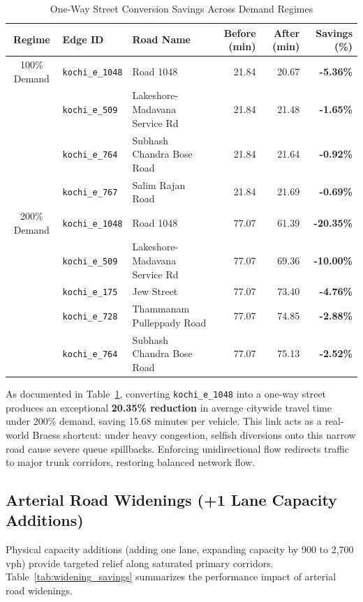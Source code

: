 \documentclass[12pt,a4paper]{report}
\begin{document}
\begin{table}[H]
\centering
\caption{One-Way Street Conversion Savings Across Demand Regimes}
\label{tab:oneway_savings}
\vspace{0.15cm}
\small
\begin{tabularx}{\textwidth}{clXrrr}
\toprule
\textbf{Regime} & \textbf{Edge ID} & \textbf{Road Name} & \textbf{Before (min)} & \textbf{After (min)} & \textbf{Savings (\%)} \\
\midrule
100\% Demand & \texttt{kochi\_e\_1048} & Road 1048 & 21.84 & 20.67 & \textbf{-5.36\%} \\
             & \texttt{kochi\_e\_509}  & Lakeshore-Madavana Service Rd & 21.84 & 21.48 & \textbf{-1.65\%} \\
             & \texttt{kochi\_e\_764}  & Subhash Chandra Bose Road & 21.84 & 21.64 & \textbf{-0.92\%} \\
             & \texttt{kochi\_e\_767}  & Salim Rajan Road & 21.84 & 21.69 & \textbf{-0.69\%} \\
\midrule
200\% Demand & \texttt{kochi\_e\_1048} & Road 1048 & 77.07 & 61.39 & \textbf{-20.35\%} \\
             & \texttt{kochi\_e\_509}  & Lakeshore-Madavana Service Rd & 77.07 & 69.36 & \textbf{-10.00\%} \\
             & \texttt{kochi\_e\_175}  & Jew Street & 77.07 & 73.40 & \textbf{-4.76\%} \\
             & \texttt{kochi\_e\_728}  & Thammanam Pulleppady Road & 77.07 & 74.85 & \textbf{-2.88\%} \\
             & \texttt{kochi\_e\_764}  & Subhash Chandra Bose Road & 77.07 & 75.13 & \textbf{-2.52\%} \\
\bottomrule
\end{tabularx}
\end{table}

As documented in Table~\ref{tab:oneway_savings}, converting \texttt{kochi\_e\_1048} into a one-way street produces an exceptional \textbf{20.35\% reduction} in average citywide travel time under 200\% demand, saving 15.68 minutes per vehicle. This link acts as a real-world Braess shortcut: under heavy congestion, selfish diversions onto this narrow road cause severe queue spillbacks. Enforcing unidirectional flow redirects traffic to major trunk corridors, restoring balanced network flow.

\subsection*{Arterial Road Widenings (+1 Lane Capacity Additions)}
Physical capacity additions (adding one lane, expanding capacity by 900 to 2,700 vph) provide targeted relief along saturated primary corridors. Table~\ref{tab:widening_savings} summarizes the performance impact of arterial road widenings.
\end{document}
